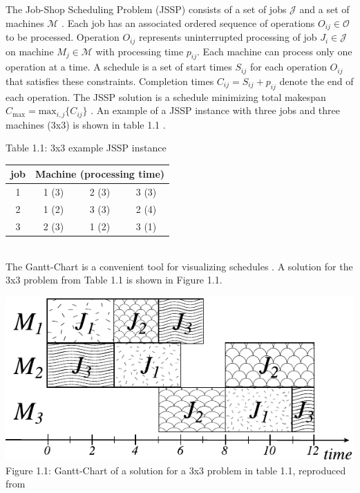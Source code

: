 The Job-Shop Scheduling Problem (JSSP) consists of a set of jobs $\mathcal{J}$ and a set of machines $\mathcal{M}$ \cite{YamadaNakanoJSSP}. Each job has an associated ordered sequence of operations $O_{ij} \in \mathcal{O}$ to be processed. Operation ${O}_{ij}$ represents uninterrupted processing of job $J_i \in \mathcal{J}$ on machine $M_j \in \mathcal{M}$ with processing time $p_{ij}$. Each machine can process only one operation at a time. A schedule is a set of start times $S_{ij}$ for each operation $O_{ij}$ that satisfies these constraints. Completion times $C_{ij} = S_{ij} + p_{ij}$ denote the end of each operation. The JSSP solution is a schedule minimizing total makespan $C_\text{max} = \text{max}_{i,j} \{C_{ij}\}$ \cite{zhang2020learning}. An example of a JSSP instance with three jobs and three machines (3x3) is shown in table 1.1 \cite{YamadaNakanoJSSP}.
\begin{table}[htbp]
    Table 1.1: 3x3 example JSSP instance \cite{YamadaNakanoJSSP}\\
    \vspace{1mm}
    \begin{tabular}{cccc}
    \hline
    job & \multicolumn{3}{c}{Machine (processing time)} \\ \hline
    1   & 1 (3)             & 2 (3)             & 3 (3)            \\
    2   & 1 (2)             & 3 (3)             & 2 (4)            \\
    3   & 2 (3)             & 1 (2)             & 3 (1)            \\ \hline
    \end{tabular}
\end{table}\\
The Gantt-Chart is a convenient tool for visualizing schedules \cite{WILSON2003430}. A solution for the 3x3 problem from Table 1.1 is shown in Figure 1.1.
\begin{center}
    \includegraphics[width=0.8\linewidth]{images/gantt-charrt.pdf}\\
    Figure 1.1: Gantt-Chart of a solution for a 3x3 problem in table 1.1, reproduced from \cite{YamadaNakanoJSSP}
\end{center}

